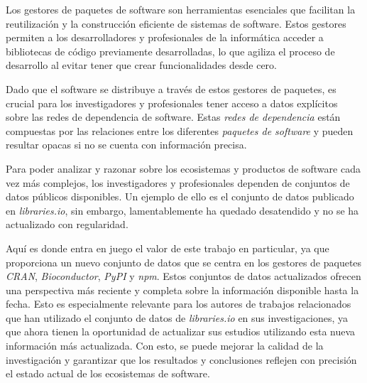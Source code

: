 
Los gestores de paquetes de software son herramientas esenciales que facilitan la reutilización y
la construcción eficiente de sistemas de software. Estos gestores permiten a los desarrolladores y
profesionales de la informática acceder a bibliotecas de código previamente desarrolladas, lo que
agiliza el proceso de desarrollo al evitar tener que crear funcionalidades desde cero.

Dado que el software se distribuye a través de estos gestores de paquetes, es crucial para los
investigadores y profesionales tener acceso a datos explícitos sobre las redes de dependencia
de software. Estas \textit{redes de dependencia} están compuestas por las relaciones entre los
diferentes \textit{paquetes de software} y pueden resultar opacas si no se cuenta con información precisa.

Para poder analizar y razonar sobre los ecosistemas y productos de software cada vez más
complejos, los investigadores y profesionales dependen de conjuntos de datos públicos disponibles.
Un ejemplo de ello es el conjunto de datos publicado en \textit{libraries.io}, sin embargo,
lamentablemente ha quedado desatendido y no se ha actualizado con regularidad.

Aquí es donde entra en juego el valor de este trabajo en particular, ya que proporciona un nuevo
conjunto de datos que se centra en los gestores de paquetes \textit{CRAN}, \textit{Bioconductor},
\textit{PyPI} y \textit{npm}. Estos conjuntos de datos actualizados ofrecen una perspectiva más
reciente y completa sobre la información disponible hasta la fecha. Esto es especialmente relevante
para los autores de trabajos relacionados que han utilizado el conjunto de datos de \textit{libraries.io}
en sus investigaciones, ya que ahora tienen la oportunidad de actualizar sus estudios utilizando
esta nueva información más actualizada. Con esto, se puede mejorar la calidad de la investigación
y garantizar que los resultados y conclusiones reflejen con precisión el estado actual de los
ecosistemas de software.

